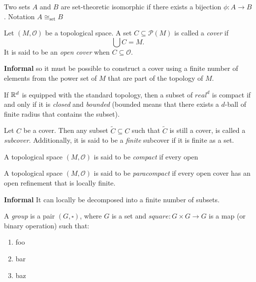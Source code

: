 \begin{definition}
    Two sets \(A\) and \(B\) are set-theoretic isomorphic if there exists a bijection \(\phi: A \to B\). Notation \(A \cong_\text{set} B\)
\end{definition}

\begin{definition}[Cover]
    Let \((M, \mathscr{O})\) be a topological space. A set \(C \subseteq \mathscr{P}(M)\) is called a \emph{cover} if
    \[ \bigcup C = M. \]
    It is said to be an \emph{open cover} when \(C \subseteq \mathscr{O}.\)
\end{definition}

\textbf{Informal} so it must be possible to construct a cover using a finite number of elements from the power set of \(M\) that are part of the topology of \(M\).

If \(\mathbb{R}^d\) is equipped with the standard topology, then a subset of \(real^d\) is compact if and only if it is \emph{closed} and \emph{bounded} (bounded means that there exists a \(d\)-ball of finite radius that contains the subset).


\begin{definition}[Subcover]
    Let \(C\) be a cover. Then any subset \(\tilde{C}\subseteq C\) such that \(\tilde{C}\) is still a cover, is called a \emph{subcover}. Additionally, it is said to be a \emph{finite} subcover if it is finite as a set.
\end{definition}

\begin{definition}[Compact]
    A topological space \((M, \mathscr{O})\) is said to be \emph{compact} if every open 
\end{definition}

\begin{definition}[Paracompact]
    A topological space \((M, \mathscr{O})\) is said to be \emph{paracompact} if every open cover has an open refinement that is locally finite.
\end{definition}

\textbf{Informal} It can locally be decomposed into a finite number of subsets.

\begin{definition}[Group]
    A \emph{group} is a pair \((G, \square)\), where \(G\) is a set and \(square: G \times G \to G\) is a map (or binary operation) such that:
    \begin{enumerate}
        \item foo 
        \item bar 
        \item baz
    \end{enumerate}
\end{definition}

